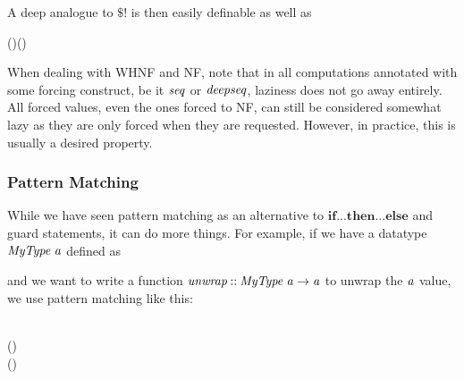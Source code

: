 \documentclass[paper=A4,twoside=true,openright,parskip=full,chapterprefix=true,headings=normal,bibliography=totoc,listof=totoc,titlepage=on,captions=tableabove,draft=false,british]{scrreprt}%
\begin{document}
A deep analogue to \ensuremath{\mathbin{\$!}} is then easily definable as well as


\begin{hscode}\SaveRestoreHook
{}%
%
\>[B]{}(\mathbin{\$!!})\mathbin{::}\;\Rightarrow (\to {})\to {}\to {}\<[E]%
\\
\>[B]{}\mathbin{\$!!}\mathrel{=}\;\<[E]%
\ColumnHook
\end{hscode}\resethooks
\vspace{-2\baselineskip}

When dealing with WHNF and NF, note that in all computations annotated
with some forcing construct, be it \ensuremath{\Varid{seq}} or \ensuremath{\Varid{deepseq}}, laziness does not
go away entirely. All forced values, even the ones forced to NF, can
still be considered somewhat lazy as they are only forced when they are
requested. However, in practice, this is usually a desired property.

\hypertarget{pattern-matching}{%
\subsubsection{Pattern Matching}\label{pattern-matching}}

While we have seen pattern matching as an alternative to
\ensuremath{\mathbf{if}\mathbin{...}\mathbf{then}\mathbin{...}\mathbf{else}} and guard statements, it can do more things. For
example, if we have a datatype \ensuremath{\Conid{MyType}\;\Varid{a}} defined as


\begin{hscode}\SaveRestoreHook
{}%
%
\>[B]{}\;\;\mathrel{=}\;\mid {}\;\<[E]%
\ColumnHook
\end{hscode}\resethooks
\vspace{-2\baselineskip}

and we want to write a function \ensuremath{\Varid{unwrap}\mathbin{::}\Conid{MyType}\;\Varid{a}\to \Varid{a}} to unwrap the
\ensuremath{\Varid{a}} value, we use pattern matching like this:


\begin{hscode}\SaveRestoreHook
{}%
%
\>[B]{}\mathbin{::}\;\to {}\<[E]%
\\
\>[B]{}\;(\;)\mathrel{=}\<[E]%
\\
\>[B]{}\;(\;)\mathrel{=}\<[E]%
\ColumnHook
\end{hscode}\resethooks
\vspace{-2\baselineskip}
\end{document}

